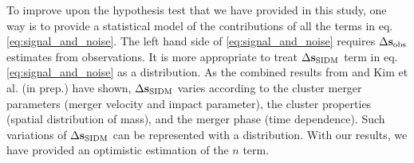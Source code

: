 To improve upon the hypothesis test that we have provided in this study, 
one way is to provide a statistical model of 
the contributions of all the terms in eq. \ref{eq:signal_and_noise}.
The left hand side of \ref{eq:signal_and_noise} requires $\Delta {\bf s}_{\rm obs}$ estimates from
observations. 
It is more appropriate to treat $\Delta {\bf s}_{\rm SIDM}$ term in eq. \ref{eq:signal_and_noise} 
as a distribution.
As the combined results from \cite{Kahlhoefer14} and Kim et al. (in prep.) have shown,
$\Delta {\bf s}_{\rm SIDM}$ varies according to the cluster merger parameters (merger
velocity and impact parameter),
the cluster properties (spatial distribution of mass), 
and the merger phase (time dependence). 
Such variations of $\Delta {\bf s}_{\rm SIDM}$ can be represented with a distribution.  
With our results, we have provided an optimistic estimation of the $n$ term.

